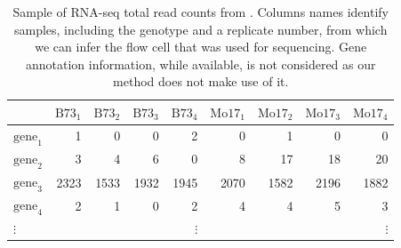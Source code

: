 
\begin{table}[ht]
\centering
\caption{\small Sample of RNA-seq total read counts from \citep{paschold}. Columns names identify samples, including the genotype and a replicate number, from which we can infer the flow cell that was used for sequencing. Gene annotation information, while available, is not considered as our method does not make use of it.}
\vspace{.2in}
\label{tab:data}
\begin{tabular}{lrrrrrrrr}
  \hline
 & $\mbox{B73}_1$ & $\mbox{B73}_2$ & $\mbox{B73}_3$ & $\mbox{B73}_4$ & $\mbox{Mo17}_1$ & $\mbox{Mo17}_2$ & $\mbox{Mo17}_3$ & $\mbox{Mo17}_4$ \\ 
  \hline
$\mbox{gene}_1$ &   1 &   0 &   0 &   2 &   0 &   1 &   0 &   0 \\ 
$\mbox{gene}_2$ &   3 &   4 &   6 &   0 &   8 &  17 &  18 &  20 \\ 
$\mbox{gene}_3$ & 2323 & 1533 & 1932 & 1945 & 2070 & 1582 & 2196 & 1882 \\ 
$\mbox{gene}_4$ &   2 &   1 &   0 &   2 &   4 &   4 &   5 &   3 \\ 
$\vdots$ &    &    &    &  $\vdots$   &   &   &   &  $\vdots$ \\ 
   \hline
\end{tabular}
\end{table}

